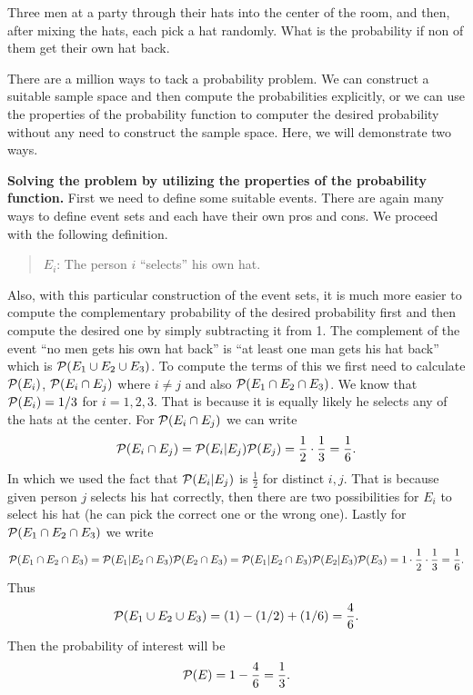	\begin{problem}
		Three men at a party through their hats into the center of the room, and then, after mixing the hats, each pick a hat randomly. What is the probability if non of them get their own hat back.
	\end{problem}
	\begin{solution}
		There are a million ways to tack a probability problem. We can construct a suitable sample space and then compute the probabilities explicitly, or we can use the properties of the probability function to computer the desired probability without any need to construct the sample space. Here, we will demonstrate two ways.
		
		\textbf{Solving the problem by utilizing the properties of the probability function.} First we need to define some suitable events. There are again many ways to define event sets and each have their own pros and cons. We proceed with the following definition.
		\begin{quote}
			$E_i$: The person $i$ ``selects'' his own hat.  
		\end{quote}
		Also, with this particular construction of the event sets, it is much more easier to compute the complementary probability of the desired probability first and then compute the desired one by simply subtracting it from 1. The complement of the event ``no men gets his own hat back'' is ``at least one man gets his hat back'' which is $\mathcal{P}(E_1\cup E_2 \cup E_3)$. To compute the terms of this we first need to calculate $\mathcal{P}(E_i)$, $\mathcal{P}(E_i \cap E_j)$ where $i\neq j$ and also $\mathcal{P}(E_1 \cap E_2 \cap E_3)$. We know that $\mathcal{P}(E_i) = 1/3$ for $i=1,2,3$. That is because it is equally likely he selects any of the hats at the center. For $\mathcal{P}(E_i\cap E_j)$ we can write
		\[ \mathcal{P}(E_i\cap E_j) = \mathcal{P}(E_i|E_j)\mathcal{P}(E_j) = \frac{1}{2}\cdot \frac{1}{3} =  \frac{1}{6}.   \]
		In which we used the fact that $\mathcal{P}(E_i|E_j)$ is $\frac{1}{2}$ for distinct $i,j$. That is because given person $j$ selects his hat correctly, then there are two possibilities for $E_i$ to select his hat (he can pick the correct one or the wrong one). Lastly for $\mathcal{P}(E_1\cap E_2\cap E_3)$ we write
		\[ \mathcal{P}(E_1\cap E_2\cap E_3) = \mathcal{P}(E_1|E_2\cap E_3)\mathcal{P}(E_2\cap E_3) = \mathcal{P}(E_1|E_2\cap E_3) \mathcal{P}(E_2 | E_3) \mathcal{P}(E_3) = 1 \cdot \frac{1}{2} \cdot \frac{1}{3} = \frac{1}{6}.  \]
		Thus 
		\[ \mathcal{P}(E_1 \cup E_2 \cup E_3) = (1) - (1/2) + (1/6) = \frac{4}{6}. \]
		Then the probability of interest will be
		\[ \mathcal{P}(E) = 1-\frac{4}{6} = \frac{1}{3}. \]
		

\end{solution}

